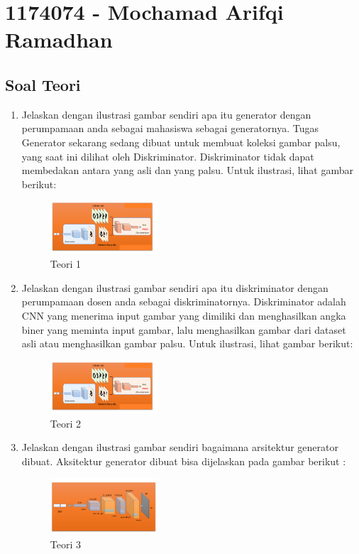 \section{1174074 - Mochamad Arifqi Ramadhan}
\subsection{Soal Teori}
\begin{enumerate}
    \item Jelaskan dengan ilustrasi gambar sendiri apa itu generator dengan perumpamaan anda sebagai mahasiswa sebagai generatornya.
    \hfill\break
    Tugas Generator sekarang sedang dibuat untuk membuat koleksi gambar palsu, yang saat ini dilihat oleh Diskriminator. Diskriminator tidak dapat membedakan antara yang asli dan yang palsu. Untuk ilustrasi, lihat gambar berikut: 
    \begin{figure}[H]
		\includegraphics[width=4cm]{figures/1174074/8/teori1,2.png}
		\centering
		\caption{Teori 1}
    \end{figure}

    \item Jelaskan dengan ilustrasi gambar sendiri apa itu diskriminator dengan perumpamaan dosen anda sebagai diskriminatornya.
    \hfill\break
    Diskriminator adalah CNN yang menerima input gambar yang dimiliki dan menghasilkan angka biner yang meminta input gambar, lalu menghasilkan gambar dari dataset asli atau menghasilkan gambar palsu. Untuk ilustrasi, lihat gambar berikut: 
    \begin{figure}[H]
		\includegraphics[width=4cm]{figures/1174074/8/teori1,2.png}
		\centering
		\caption{Teori 2}
    \end{figure}

    \item Jelaskan dengan ilustrasi gambar sendiri bagaimana arsitektur generator dibuat.
	\hfill\break
    Aksitektur generator dibuat bisa dijelaskan pada gambar berikut :
    \begin{figure}[H]
		\includegraphics[width=4cm]{figures/1174074/8/teori3.png}
		\centering
		\caption{Teori 3}
    \end{figure}


\end{enumerate}

